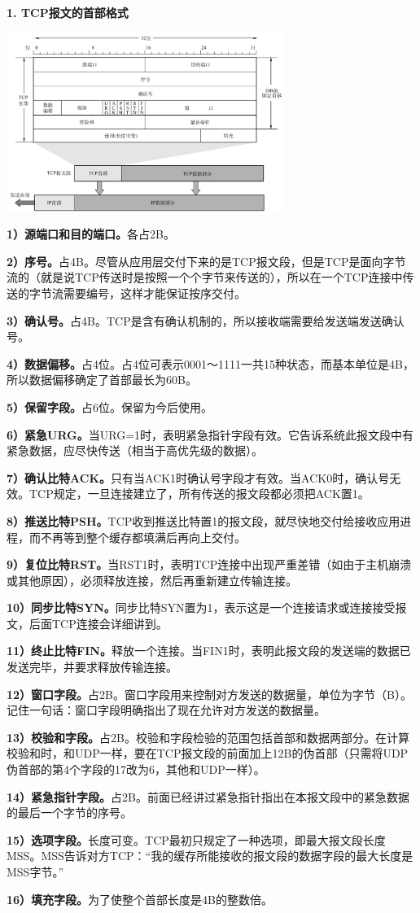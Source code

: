 \textbf{{1. TCP报文的首部格式}}

\textbf{{\includegraphics[width=3.54167in,height=2.29167in]{png-jpeg-pics/75C7D85D81D38FABFB6DC1B40CC50A32.png}\\
}}

\textbf{1）源端口和目的端口。}{各占2B。}

\textbf{2）序号。}占4B。尽管从应用层交付下来的是TCP报文段，但是TCP是面向字节流的（就是说TCP传送时是按照一个个字节来传送的），所以在一个TCP连接中传送的字节流需要编号，这样才能保证按序交付。

\textbf{3）确认号。}占4B。TCP是含有确认机制的，所以接收端需要给发送端发送确认号。

\textbf{4）数据偏移。}占4位。占4位可表示0001～1111一共15种状态，而基本单位是4B，所以数据偏移确定了首部最长为60B。

\textbf{5）保留字段。}占6位。保留为今后使用。

\textbf{6）紧急URG。}当URG=1时，表明紧急指针字段有效。它告诉系统此报文段中有紧急数据，应尽快传送（相当于高优先级的数据）。

\textbf{7）确认比特ACK。}只有当ACK1时确认号字段才有效。当ACK0时，确认号无效。TCP规定，一旦连接建立了，所有传送的报文段都必须把ACK置1。

\textbf{8）推送比特PSH。}TCP收到推送比特置1的报文段，就尽快地交付给接收应用进程，而不再等到整个缓存都填满后再向上交付。

\textbf{9）复位比特RST。}当RST1时，表明TCP连接中出现严重差错（如由于主机崩溃或其他原因），必须释放连接，然后再重新建立传输连接。

\textbf{10）同步比特SYN。}同步比特SYN置为1，表示这是一个连接请求或连接接受报文，后面TCP连接会详细讲到。

\textbf{11）终止比特FIN。}释放一个连接。当FIN1时，表明此报文段的发送端的数据已发送完毕，并要求释放传输连接。

\textbf{12）窗口字段。}占2B。窗口字段用来控制对方发送的数据量，单位为字节（B）。记住一句话：窗口字段明确指出了现在允许对方发送的数据量。

\textbf{13）校验和字段。}占2B。校验和字段检验的范围包括首部和数据两部分。在计算校验和时，和UDP一样，要在TCP报文段的前面加上12B的伪首部（只需将UDP伪首部的第4个字段的17改为6，其他和UDP一样）。

\textbf{14）紧急指针字段。}占2B。前面已经讲过紧急指针指出在本报文段中的紧急数据的最后一个字节的序号。

\textbf{15）选项字段。}长度可变。TCP最初只规定了一种选项，即最大报文段长度MSS。MSS告诉对方TCP：``我的缓存所能接收的报文段的数据字段的最大长度是MSS字节。''

\textbf{16）填充字段。}为了使整个首部长度是4B的整数倍。
